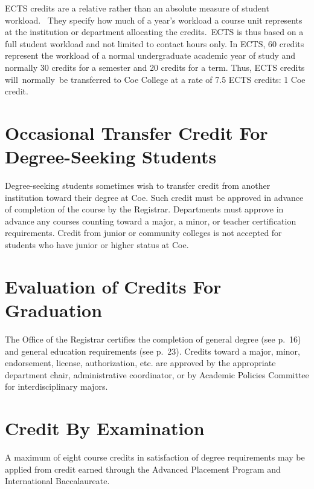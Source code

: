 \documentclass[
  letterpaper,
]{scrbook}
\begin{document}
ECTS credits are a relative rather than an absolute measure of student
workload.~ They specify how much of a year's workload a course unit
represents at the institution or department allocating the credits.~ECTS
is thus based on a full student workload and not limited to contact
hours only. In ECTS, 60 credits represent the workload of a normal
undergraduate academic year of study and normally 30 credits for a
semester and 20 credits for a term. Thus, ECTS credits will~normally~be
transferred to Coe College at a rate of 7.5 ECTS credits: 1 Coe credit.

\hypertarget{occasional-transfer-credit-for-degree-seeking-students}{%
\section{Occasional Transfer Credit For Degree-Seeking
Students}\label{occasional-transfer-credit-for-degree-seeking-students}}

Degree-seeking students sometimes wish to transfer credit from another
institution toward their degree at Coe. Such credit must be approved in
advance of completion of the course by the Registrar. Departments must
approve in advance any courses counting toward a major, a minor, or
teacher certification requirements. Credit from junior or community
colleges is not accepted for students who have junior or higher status
at Coe.

\hypertarget{evaluation-of-credits-for-graduation}{%
\section{Evaluation of Credits For
Graduation}\label{evaluation-of-credits-for-graduation}}

The Office of the Registrar certifies the completion of general degree
(see p.~16) and general education requirements (see p.~23). Credits
toward a major, minor, endorsement, license, authorization, etc. are
approved by the appropriate department chair, administrative
coordinator, or by Academic Policies Committee for interdisciplinary
majors.

\hypertarget{credit-by-examination}{%
\section{Credit By Examination}\label{credit-by-examination}}

A maximum of eight course credits in satisfaction of degree requirements
may be applied from credit earned through the Advanced Placement Program
and International Baccalaureate.
\end{document}
